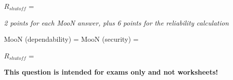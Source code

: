 \vskip 10pt

$R_{shutoff}$ = \underbar{\hskip 50pt}







{\it 2 points for each MooN answer, plus 6 points for the reliability calculation}

\vskip 10pt

MooN (dependability) =   \hskip 70pt MooN (security) = 

\vskip 10pt

$R_{shutoff}$ = 







{\bf This question is intended for exams only and not worksheets!}



